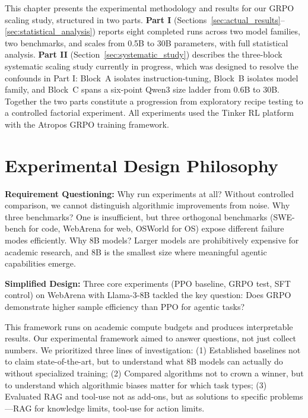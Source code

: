 \documentclass[12pt,a4paper]{report}
\theoremstyle{definition}
\begin{document}
This chapter presents the experimental methodology and results for our GRPO scaling study, structured in two parts.  \textbf{Part I} (Sections~\ref{sec:actual_results}--\ref{sec:statistical_analysis}) reports eight completed runs across two model families, two benchmarks, and scales from 0.5B to 30B parameters, with full statistical analysis.  \textbf{Part II} (Section~\ref{sec:systematic_study}) describes the three-block systematic scaling study currently in progress, which was designed to resolve the confounds in Part I: Block~A isolates instruction-tuning, Block~B isolates model family, and Block~C spans a six-point Qwen3 size ladder from 0.6B to 30B.  Together the two parts constitute a progression from exploratory recipe testing to a controlled factorial experiment.  All experiments used the Tinker RL platform with the Atropos GRPO training framework.

\vspace{0.3cm}

\section{Experimental Design Philosophy}
\label{sec:design_philosophy}

\textbf{Requirement Questioning:} Why run experiments at all? Without controlled comparison, we cannot distinguish algorithmic improvements from noise. Why three benchmarks? One is insufficient, but three orthogonal benchmarks (SWE-bench for code, WebArena for web, OSWorld for OS) expose different failure modes efficiently. Why 8B models? Larger models are prohibitively expensive for academic research, and 8B is the smallest size where meaningful agentic capabilities emerge.

\textbf{Simplified Design:} Three core experiments (PPO baseline, GRPO test, SFT control) on WebArena with Llama-3-8B tackled the key question: Does GRPO demonstrate higher sample efficiency than PPO for agentic tasks?

This framework runs on academic compute budgets and produces interpretable results.
Our experimental framework aimed to answer questions, not just collect numbers. We prioritized three lines of investigation: (1) Established baselines not to claim state-of-the-art, but to understand what 8B models can actually do without specialized training; (2) Compared algorithms not to crown a winner, but to understand which algorithmic biases matter for which task types; (3) Evaluated RAG and tool-use not as add-ons, but as solutions to specific problems---RAG for knowledge limits, tool-use for action limits.
\end{document}
